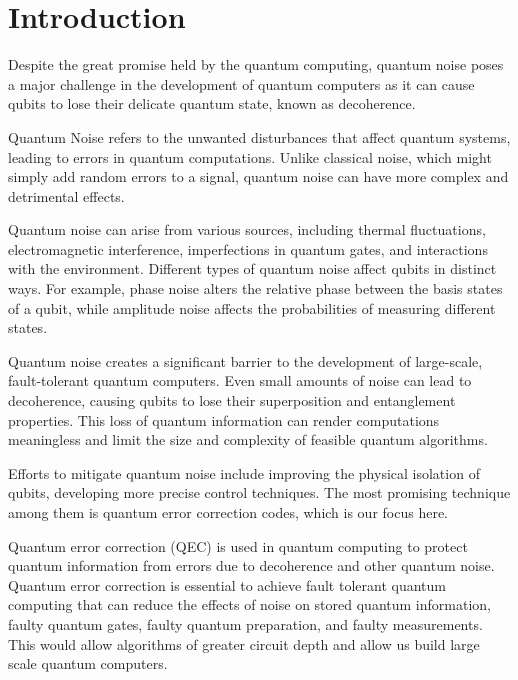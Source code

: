 \Contributor{}

\lstset{style=mystyle}


	\MakeScribeTop


\section{Introduction}
Despite the great promise held by the quantum computing, quantum noise poses a major challenge in the development of quantum computers as it can cause qubits to lose their delicate quantum state, known as decoherence.

Quantum Noise refers to the unwanted disturbances that affect quantum systems, leading to errors in quantum computations. Unlike classical noise, which might simply add random errors to a signal, quantum noise can have more complex and detrimental effects. 

Quantum noise can arise from various sources, including thermal fluctuations, electromagnetic interference, imperfections in quantum gates, and interactions with the environment. Different types of quantum noise affect qubits in distinct ways. For example, phase noise alters the relative phase between the basis states of a qubit, while amplitude noise affects the probabilities of measuring different states. 

Quantum noise creates a significant barrier to the development of large-scale, fault-tolerant quantum computers. Even small amounts of noise can lead to decoherence, causing qubits to lose their superposition and entanglement properties. This loss of quantum information can render computations meaningless and limit the size and complexity of feasible quantum algorithms. 


Efforts to mitigate quantum noise include improving the physical isolation of qubits, developing more precise control techniques. The most promising technique among them is quantum error correction codes, which is our focus here. 


Quantum error correction (QEC) is used in quantum computing to protect quantum information from errors due to decoherence and other quantum noise. Quantum error correction is essential to achieve fault tolerant quantum computing that can reduce the effects of noise on stored quantum information, faulty quantum gates, faulty quantum preparation, and faulty measurements. This would allow algorithms of greater circuit depth and allow us build large scale quantum computers.

